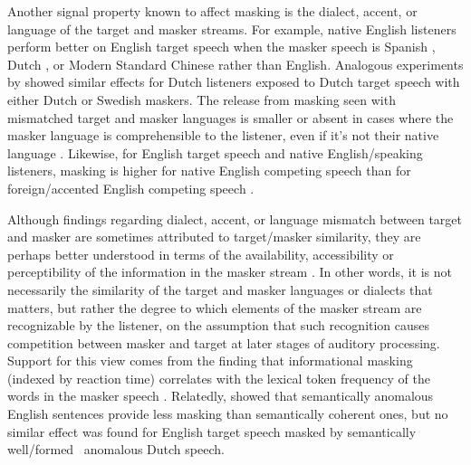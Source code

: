 Another signal property known to affect masking is the dialect, accent, or language of the target and masker streams.  For example, native English listeners perform better on English target speech when the masker speech is Spanish \citep{GarciaLecumberriCooke2006}, Dutch \citep{BrouwerEtAl2012}, or Modern Standard Chinese \citep{VanEngenBradlow2007} rather than English.  Analogous experiments by \citet{RhebergenEtAl2005} showed similar effects for Dutch listeners exposed to Dutch target speech with either Dutch or Swedish maskers.  The release from masking seen with mismatched target and masker languages is smaller or absent in cases where the masker language is comprehensible to the listener, even if it’s not their native language \citep{GarciaLecumberriCooke2006, VanEngen2010, BrouwerEtAl2012}.  Likewise, for English target speech and native English\-/speaking listeners, masking is higher for native English competing speech than for foreign\-/accented English competing speech \citep{CalandruccioEtAl2010}.\footnotemark{}

Although findings regarding dialect, accent, or language mismatch between target and masker are sometimes attributed to target\-/masker similarity, they are perhaps better understood in terms of the availability, accessibility or perceptibility of the information in the masker stream \citep{VanEngenBradlow2007, CalandruccioEtAl2010, BrouwerEtAl2012}.  In other words, it is not necessarily the similarity of the target and masker languages or dialects that matters, but rather the degree to which elements of the masker stream are recognizable by the listener, on the assumption that such recognition causes competition between masker and target at later stages of auditory processing.  Support for this view comes from the finding that informational masking (indexed by reaction time) correlates with the lexical token frequency of the words in the masker speech \citep{BoulengerEtAl2010}.  Relatedly, \citet{BrouwerEtAl2012} showed that semantically anomalous English sentences provide less masking than semantically coherent ones, but no similar effect was found for English target speech masked by semantically well\-/formed \vs\ anomalous Dutch speech.  

